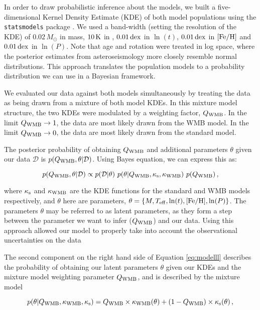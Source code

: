 In order to draw probabilistic inference about the models, we built a five-dimensional Kernel Density Estimate (KDE) of both model populations using the \texttt{statsmodels} package \cite{seabold+perktold2010}. We used a band-width (setting the resolution of the KDE) of $0.02\, M_\odot$ in mass, $10\, \rm K$ in \teff, $0.01\, \rm{dex}$ in $\ln(t)$, $0.01\, \rm{dex}$ in $\rm{[Fe/H]}$ and $0.01\, \rm{dex}$ in $\ln(P)$. Note that age and rotation were treated in log space, where the posterior estimates from asteroseismology more closely resemble normal distributions. This approach translates the population models to a probability distribution we can use in a Bayesian framework.

We evaluated our data against both models simultaneously by treating the data as being drawn from a mixture of both model KDEs. In this mixture model structure, the two KDEs were modulated by a weighting factor, $Q_{\rm WMB}$. In the limit $Q_{\rm WMB} \rightarrow 1$, the data are most likely drawn from the WMB model. In the limit $Q_{\rm WMB} \rightarrow 0$, the data are most likely drawn from the standard model.

The posterior probability of obtaining $Q_{\rm WMB}$ and additional parameters $\theta$ given our data $\mathcal{D}$ is $p(Q_{\rm{WMB}}, \theta | \mathcal{D})$. Using Bayes equation, we can express this as:

\begin{equation}\label{eq:modelll}
	p(Q_{\rm{WMB}}, \theta | \mathcal{D}) \propto p(\mathcal{D} | \theta)\ p(\theta | Q_{\rm{WMB}}, \kappa_{\rm{s}}, \kappa_{\rm{WMB}})\ p(Q_{\rm{WMB}})\, ,
\end{equation}

\noindent where $\kappa_{\rm{s}}$ and $\kappa_{\rm{WMB}}$ are the KDE functions for the standard and WMB models respectively, and $\theta$ here are parameters, $\theta = \{M, \mbox{$T_{\rm eff}$}, \ln(t), \mbox{$\rm{[Fe/H]}$}, \ln(P)\}$. The parameters $\theta$ may be referred to as latent parameters, as they form a step between the parameter we want to infer ($Q_{\rm{WMB}}$) and our data. Using this approach allowed our model to properly take into account the observational uncertainties on the data 

The second component on the right hand side of Equation \ref{eq:modelll} describes the probability of obtaining our latent parameters $\theta$ given our KDEs and the mixture model weighting parameter $Q_{\rm WMB}$, and is described by the mixture model

\begin{equation}\label{eq:mixturell}
	p(\theta | Q_{\rm{WMB}}, \kappa_{\rm{WMB}}, \kappa_{\rm{s}}) = Q_{\rm WMB} \times \kappa_{\rm WMB}(\theta) + (1 - Q_{\rm WMB}) \times \kappa_{\rm s}(\theta)\, ,
\end{equation}

